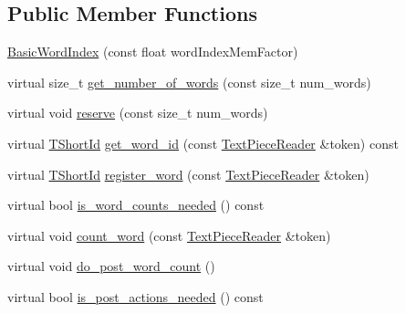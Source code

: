 \subsection*{Public Member Functions}
\begin{DoxyCompactItemize}
\item 
\hyperlink{classuva_1_1smt_1_1tries_1_1dictionary_1_1_basic_word_index_a86bfea6c929c9886d2ab4d96bd50beef}{Basic\+Word\+Index} (const float word\+Index\+Mem\+Factor)
\item 
virtual size\+\_\+t \hyperlink{classuva_1_1smt_1_1tries_1_1dictionary_1_1_basic_word_index_a63a18dd7eea972474405553879813516}{get\+\_\+number\+\_\+of\+\_\+words} (const size\+\_\+t num\+\_\+words)
\item 
virtual void \hyperlink{classuva_1_1smt_1_1tries_1_1dictionary_1_1_basic_word_index_a6255befbaf98669009f5fbff5b2b1321}{reserve} (const size\+\_\+t num\+\_\+words)
\item 
virtual \hyperlink{namespaceuva_1_1smt_1_1hashing_adcf22e1982ad09d3a63494c006267469}{T\+Short\+Id} \hyperlink{classuva_1_1smt_1_1tries_1_1dictionary_1_1_basic_word_index_a2d11b65cbc479d49c9477c9546e6f1d7}{get\+\_\+word\+\_\+id} (const \hyperlink{classuva_1_1smt_1_1file_1_1_text_piece_reader}{Text\+Piece\+Reader} \&token) const 
\item 
virtual \hyperlink{namespaceuva_1_1smt_1_1hashing_adcf22e1982ad09d3a63494c006267469}{T\+Short\+Id} \hyperlink{classuva_1_1smt_1_1tries_1_1dictionary_1_1_basic_word_index_abbc772ebe00dc62b65c6f412d70aa0ac}{register\+\_\+word} (const \hyperlink{classuva_1_1smt_1_1file_1_1_text_piece_reader}{Text\+Piece\+Reader} \&token)
\item 
virtual bool \hyperlink{classuva_1_1smt_1_1tries_1_1dictionary_1_1_basic_word_index_a4b94094d513c9281cde965f91b71d970}{is\+\_\+word\+\_\+counts\+\_\+needed} () const 
\item 
virtual void \hyperlink{classuva_1_1smt_1_1tries_1_1dictionary_1_1_basic_word_index_a932348f67a73ca34773ad0472faeda8c}{count\+\_\+word} (const \hyperlink{classuva_1_1smt_1_1file_1_1_text_piece_reader}{Text\+Piece\+Reader} \&token)
\item 
virtual void \hyperlink{classuva_1_1smt_1_1tries_1_1dictionary_1_1_basic_word_index_aa90d2673f5386030b8b1013c0a106efc}{do\+\_\+post\+\_\+word\+\_\+count} ()
\item 
virtual bool \hyperlink{classuva_1_1smt_1_1tries_1_1dictionary_1_1_basic_word_index_a50fbede350d439367b66d736c24a3dac}{is\+\_\+post\+\_\+actions\+\_\+needed} () const 
\item 

\end{DoxyCompactItemize}
